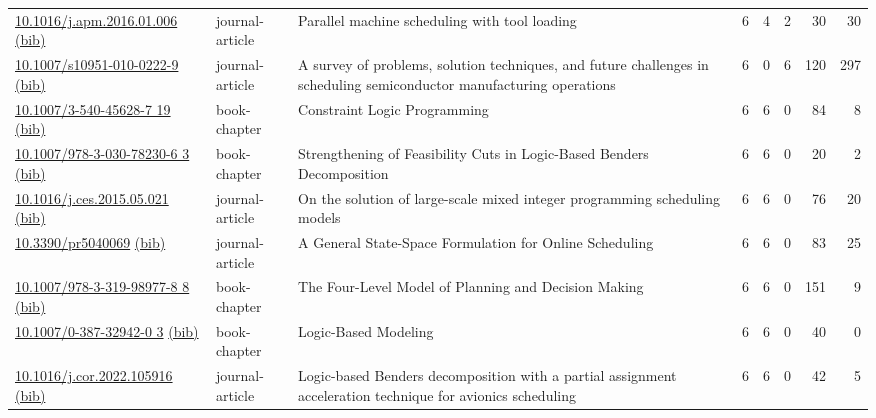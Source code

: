{\begin{longtable}{p{5cm}lp{11cm}rrrrr}
\href{http://dx.doi.org/10.1016/j.apm.2016.01.006}{10.1016/j.apm.2016.01.006} \href{https://www.doi2bib.org/bib/10.1016/j.apm.2016.01.006}{(bib)} & journal-article & Parallel machine scheduling with tool loading & 6 & 4 & 2 & 30 & 30 \\
\href{http://dx.doi.org/10.1007/s10951-010-0222-9}{10.1007/s10951-010-0222-9} \href{https://www.doi2bib.org/bib/10.1007/s10951-010-0222-9}{(bib)} & journal-article & A survey of problems, solution techniques, and future challenges in scheduling semiconductor manufacturing operations & 6 & 0 & 6 & 120 & 297 \\
\href{http://dx.doi.org/10.1007/3-540-45628-7_19}{10.1007/3-540-45628-7 19} \href{https://www.doi2bib.org/bib/10.1007/3-540-45628-7_19}{(bib)} & book-chapter & Constraint Logic Programming & 6 & 6 & 0 & 84 & 8 \\
\href{http://dx.doi.org/10.1007/978-3-030-78230-6_3}{10.1007/978-3-030-78230-6 3} \href{https://www.doi2bib.org/bib/10.1007/978-3-030-78230-6_3}{(bib)} & book-chapter & Strengthening of Feasibility Cuts in Logic-Based Benders Decomposition & 6 & 6 & 0 & 20 & 2 \\
\href{http://dx.doi.org/10.1016/j.ces.2015.05.021}{10.1016/j.ces.2015.05.021} \href{https://www.doi2bib.org/bib/10.1016/j.ces.2015.05.021}{(bib)} & journal-article & On the solution of large-scale mixed integer programming scheduling models & 6 & 6 & 0 & 76 & 20 \\
\href{http://dx.doi.org/10.3390/pr5040069}{10.3390/pr5040069} \href{https://www.doi2bib.org/bib/10.3390/pr5040069}{(bib)} & journal-article & A General State-Space Formulation for Online Scheduling & 6 & 6 & 0 & 83 & 25 \\
\href{http://dx.doi.org/10.1007/978-3-319-98977-8_8}{10.1007/978-3-319-98977-8 8} \href{https://www.doi2bib.org/bib/10.1007/978-3-319-98977-8_8}{(bib)} & book-chapter & The Four-Level Model of Planning and Decision Making & 6 & 6 & 0 & 151 & 9 \\
\href{http://dx.doi.org/10.1007/0-387-32942-0_3}{10.1007/0-387-32942-0 3} \href{https://www.doi2bib.org/bib/10.1007/0-387-32942-0_3}{(bib)} & book-chapter & Logic-Based Modeling & 6 & 6 & 0 & 40 & 0 \\
\href{http://dx.doi.org/10.1016/j.cor.2022.105916}{10.1016/j.cor.2022.105916} \href{https://www.doi2bib.org/bib/10.1016/j.cor.2022.105916}{(bib)} & journal-article & Logic-based Benders decomposition with a partial assignment acceleration technique for avionics scheduling & 6 & 6 & 0 & 42 & 5 \\

\end{longtable}}
